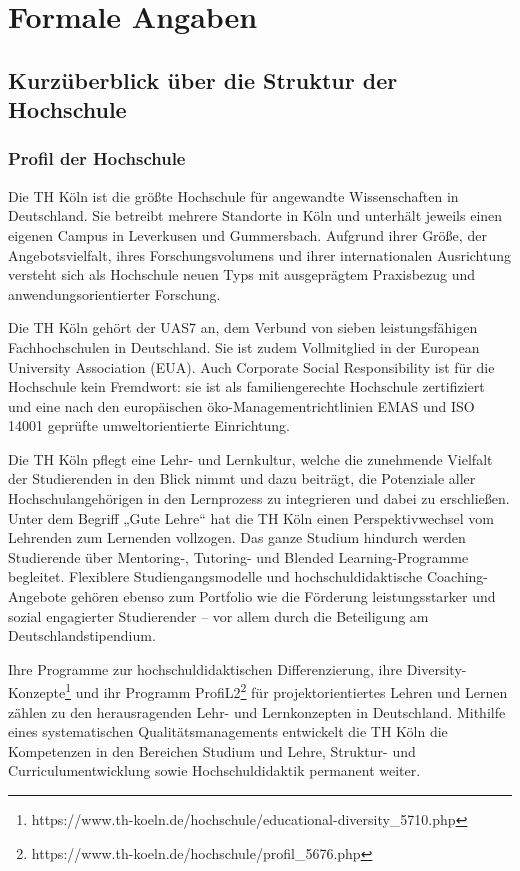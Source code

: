 \chapter{Formale Angaben}\label{formale-angaben}

\section{Kurzüberblick über die Struktur der
Hochschule}\label{kurzuxfcberblick-uxfcber-die-struktur-der-hochschule}

\subsection{Profil der Hochschule}\label{profil-der-hochschule}

Die TH Köln ist die größte Hochschule für angewandte Wissenschaften in
Deutschland. Sie betreibt mehrere Standorte in Köln und unterhält
jeweils einen eigenen Campus in Leverkusen und Gummersbach. Aufgrund
ihrer Größe, der Angebotsvielfalt, ihres Forschungsvolumens und ihrer
internationalen Ausrichtung versteht sich als Hochschule neuen Typs mit
ausgeprägtem Praxisbezug und anwendungsorientierter Forschung.

Die TH Köln gehört der UAS7 an, dem Verbund von sieben leistungsfähigen
Fachhochschulen in Deutschland. Sie ist zudem Vollmitglied in der
European University Association (EUA). Auch Corporate Social
Responsibility ist für die Hochschule kein Fremdwort: sie ist als
familiengerechte Hochschule zertifiziert und eine nach den europäischen
öko-Managementrichtlinien EMAS und ISO 14001 geprüfte umweltorientierte
Einrichtung.

Die TH Köln pflegt eine Lehr- und Lernkultur, welche die zunehmende
Vielfalt der Studierenden in den Blick nimmt und dazu beiträgt, die
Potenziale aller Hochschulangehörigen in den Lernprozess zu integrieren
und dabei zu erschließen. Unter dem Begriff „Gute Lehre`` hat die TH
Köln einen Perspektivwechsel vom Lehrenden zum Lernenden vollzogen. Das
ganze Studium hindurch werden Studierende über Mentoring-, Tutoring- und
Blended Learning-Programme begleitet. Flexiblere Studiengangsmodelle und
hochschuldidaktische Coaching-Angebote gehören ebenso zum Portfolio wie
die Förderung leistungsstarker und sozial engagierter Studierender --
vor allem durch die Beteiligung am Deutschlandstipendium.

Ihre Programme zur hochschuldidaktischen Differenzierung, ihre
Diversity-Konzepte\footnote{https://www.th-koeln.de/hochschule/educational-diversity\_5710.php}
und ihr Programm ProfiL2\footnote{https://www.th-koeln.de/hochschule/profil\_5676.php}
für projektorientiertes Lehren und Lernen zählen zu den herausragenden
Lehr- und Lernkonzepten in Deutschland. Mithilfe eines systematischen
Qualitätsmanagements entwickelt die TH Köln die Kompetenzen in den
Bereichen Studium und Lehre, Struktur- und Curriculumentwicklung sowie
Hochschuldidaktik permanent weiter.

